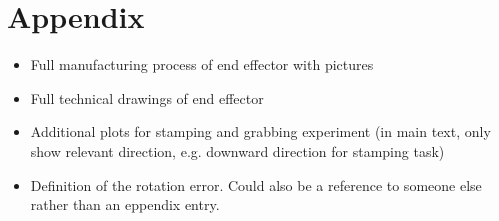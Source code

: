 \documentclass[a4paper, 10pt, conference]{ieeeconf}
\begin{document}
    \section{Appendix}
    \begin{itemize}
    \item Full manufacturing process of end effector with pictures
    \item Full technical drawings of end effector

    \item Additional plots for stamping and grabbing experiment (in main text, only show relevant direction, e.g. downward direction for stamping task)
    \item Definition of the rotation error. Could also be a reference to someone else rather than an eppendix entry.

    \end{itemize}



\end{document}
